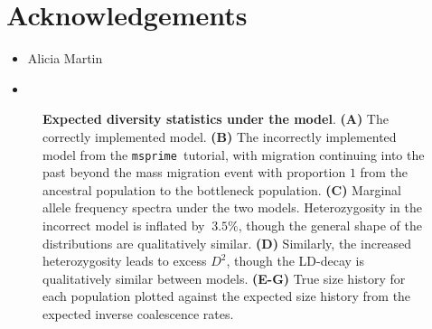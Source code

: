 \documentclass{article}
\newcommand{\msprime}[0]{\texttt{msprime}}
\begin{document}
\section*{Acknowledgements}

\begin{itemize}
\item Alicia Martin
\item
\end{itemize}




\pagebreak

\begin{figure}[ht]
\begin{center}
\caption{\textbf{Expected diversity statistics under the \citet{gutenkunst2009inferring} model}.
    \textbf{(A)} The correctly implemented model.
    \textbf{(B)} The incorrectly implemented model from the \msprime\ tutorial, with migration continuing
    into the past beyond the mass migration event with proportion $1$ from the ancestral population
    to the bottleneck population.
    \textbf{(C)} Marginal allele frequency spectra under the two models. Heterozygosity in the incorrect model
    is inflated by $~3.5\%$, though the general shape of the distributions are qualitatively similar.
    \textbf{(D)} Similarly, the increased heterozygosity leads to excess $D^2$, though the LD-decay is
    qualitatively similar between models.
    \textbf{(E-G)} True size history for each population plotted against the expected size history from
    the expected inverse coalescence rates.
}
\label{fig:ooa_stats}
\end{center}
\end{figure}
\end{document}
